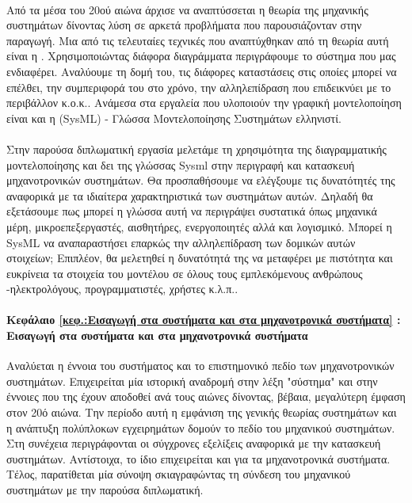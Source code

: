 \documentclass[a4paper,12pt,twoside]{report}
\begin{document}
		\paragraph{}{Από τα μέσα του 20ού αιώνα άρχισε να αναπτύσσεται η θεωρία της μηχανικής συστημάτων δίνοντας λύση σε αρκετά προβλήματα που παρουσιάζονταν στην παραγωγή. Μια από τις τελευταίες τεχνικές που αναπτύχθηκαν από τη θεωρία αυτή είναι η . Χρησιμοποιώντας διάφορα διαγράμματα περιγράφουμε το σύστημα που μας ενδιαφέρει. Αναλύουμε τη δομή του, τις διάφορες καταστάσεις στις οποίες μπορεί να επέλθει, την συμπεριφορά του στο χρόνο, την αλληλεπίδραση που επιδεικνύει με το περιβάλλον κ.ο.κ.. Ανάμεσα στα εργαλεία που υλοποιούν την γραφική μοντελοποίηση είναι και η  (SysML) - Γλώσσα Μοντελοποίησης Συστημάτων ελληνιστί.
		}
		\paragraph{}{Στην παρούσα διπλωματική εργασία μελετάμε τη χρησιμότητα της διαγραμματικής μοντελοποίησης και δει της γλώσσας Sysml στην περιγραφή και κατασκευή μηχανοτρονικών συστημάτων. Θα προσπαθήσουμε να ελέγξουμε τις δυνατότητές της αναφορικά με τα ιδιαίτερα χαρακτηριστικά των συστημάτων αυτών. Δηλαδή θα εξετάσουμε πως μπορεί η γλώσσα αυτή να περιγράψει συστατικά όπως μηχανικά μέρη, μικροεπεξεργαστές, αισθητήρες, ενεργοποιητές αλλά και λογισμικό. Μπορεί η SysML να αναπαραστήσει επαρκώς την αλληλεπίδραση των δομικών αυτών στοιχείων; Επιπλέον, θα μελετηθεί η δυνατότητά της να μεταφέρει με πιστότητα και ευκρίνεια τα στοιχεία του μοντέλου σε όλους τους εμπλεκόμενους ανθρώπους -ηλεκτρολόγους, προγραμματιστές, χρήστες κ.λ.π..
		}
		
		\paragraph{Κεφάλαιο \ref{κεφ.:Εισαγωγή στα συστήματα και στα μηχανοτρονικά συστήματα} : Εισαγωγή στα συστήματα και στα μηχανοτρονικά συστήματα} {Αναλύεται η έννοια του συστήματος και το επιστημονικό πεδίο των μηχανοτρονικών συστημάτων. Επιχειρείται μία ιστορική αναδρομή στην λέξη "σύστημα" και στην έννοιες που της έχουν αποδοθεί ανά τους αιώνες δίνοντας, βέβαια, μεγαλύτερη έμφαση στον 20ό αιώνα. Την περίοδο αυτή η εμφάνιση της γενικής θεωρίας συστημάτων και η ανάπτυξη πολύπλοκων εγχειρημάτων δομούν το πεδίο του μηχανικού συστημάτων. Στη συνέχεια περιγράφονται οι σύγχρονες εξελίξεις αναφορικά με την κατασκευή συστημάτων. Αντίστοιχα, το ίδιο επιχειρείται και για τα μηχανοτρονικά συστήματα. Τέλος, παρατίθεται μία σύνοψη σκιαγραφώντας τη σύνδεση του μηχανικού συστημάτων με την παρούσα διπλωματική.
		}
\end{document}
